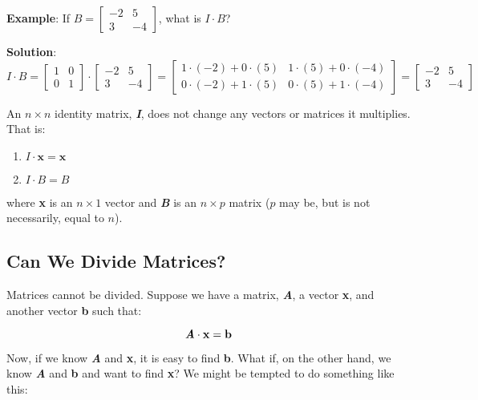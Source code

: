 \textbf{Example}: If $\mathbf{\mathit{B}} = \begin{bmatrix}
-2 & 5\\
3 & -4
\end{bmatrix}$, what is $\mathbf{\mathit{I}} \cdot \mathbf{\mathit{B}}$?

\textbf{Solution}: $$\mathbf{\mathit{I}} \cdot \mathbf{\mathit{B}} = 
\begin{bmatrix}
1 & 0 \\
0 & 1
\end{bmatrix} \cdot \begin{bmatrix}
-2 & 5\\
3 & -4
\end{bmatrix} = \begin{bmatrix}
1 \cdot (-2) + 0 \cdot (5) & 1 \cdot (5) + 0 \cdot (-4)\\
0 \cdot (-2) + 1 \cdot (5) & 0 \cdot (5) + 1 \cdot (-4)
\end{bmatrix} = \begin{bmatrix}
-2 & 5\\
3 & -4
\end{bmatrix}$$

\begin{mdframed}[style = important, frametitle = {Properties of the Identity Matrix}]
An $n \times n$ identity matrix, \textbf{\textit{I}}, does not change any 
vectors or matrices it multiplies. That is: 
\begin{enumerate}
\item $\mathbf{\mathit{I}} \cdot \mathbf{x} = \mathbf{x}$
\item $\mathbf{\mathit{I}} \cdot \mathbf{\mathit{B}} = \mathbf{\mathit{B}}$
\end{enumerate}
where \textbf{x} is an $n \times 1$ vector and \textbf{\textit{B}} is an $n 
\times p$ matrix ($p$ may be, but is not necessarily, equal to $n$). 
\end{mdframed}

\subsection{Can We Divide Matrices?}
Matrices cannot be divided. Suppose we have a matrix, \textbf{\textit{A}}, a vector \textbf{x}, and another vector \textbf{b} such that:

$$\textbf{\textit{A}} \cdot \textbf{x} = \textbf{b}$$

Now, if we know \textbf{\textit{A}} and \textbf{x}, it is easy to find \textbf{b}. What if, on the other hand, we know \textbf{\textit{A}} and \textbf{b} and want to find \textbf{x}? We might be tempted to do something like this:

